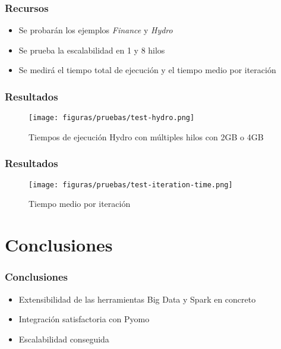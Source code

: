 \documentclass{beamer}
\begin{document}
\begin{frame}{}
    \frametitle{Recursos}
    \begin{itemize}
        \item Se probarán los ejemplos \textit{Finance} y \textit{Hydro}
        \item Se prueba la escalabilidad en 1 y 8 hilos
        \item Se medirá el tiempo total de ejecución y el tiempo medio por iteración
    \end{itemize}
\end{frame}

\begin{frame}[plain]
    \frametitle{Resultados}
    \begin{figure}[H]
        \centerline{\texttt{[image: figuras/pruebas/test-hydro.png]}}
        \caption{Tiempos de ejecución Hydro con múltiples hilos con 2GB o 4GB}
        \label{fig:test-hydro}
    \end{figure}
\end{frame}

\begin{frame}[plain]
    \frametitle{Resultados}
    \begin{figure}[H]
        \centerline{\texttt{[image: figuras/pruebas/test-iteration-time.png]}}
        \caption{Tiempo medio por iteración}
        \label{fig:test-iteration-time}
    \end{figure}
\end{frame}

\section{Conclusiones}

\begin{frame}{}
    \frametitle{Conclusiones}
    \begin{itemize}
        \item Extensibilidad de las herramientas Big Data y Spark en concreto \pause
        \item Integración satisfactoria con Pyomo \pause
        \item Escalabilidad conseguida
    \end{itemize}
\end{frame}
\end{document}
